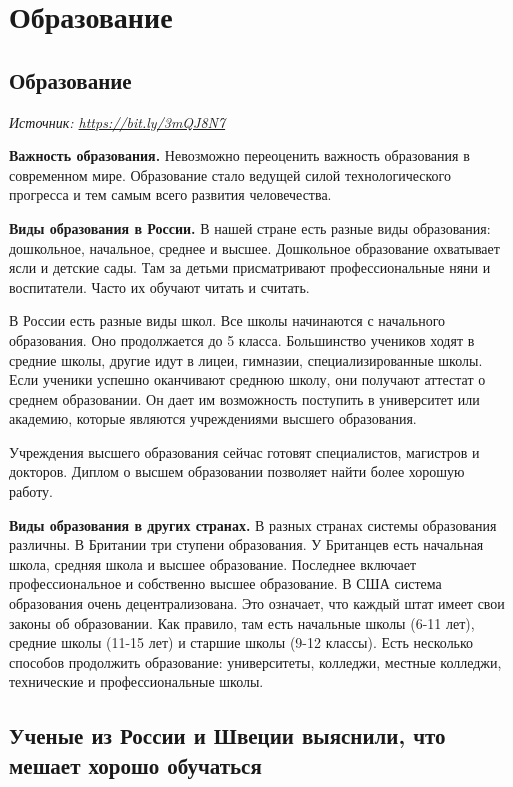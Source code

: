 \chapter{Образование}

\section{Образование}

\textit{Источник: \url{https://bit.ly/3mQJ8N7}}

\textbf{Важность образования.}
Невозможно переоценить важность образования в современном мире. Образование стало ведущей силой технологического прогресса и тем самым всего развития человечества.

\textbf{Виды образования в России.}
В нашей стране есть разные виды образования: дошкольное, начальное, среднее и высшее.
Дошкольное образование охватывает ясли и детские сады. Там за детьми присматривают профессиональные няни и воспитатели. Часто их обучают читать и считать.

В России есть разные виды школ. Все школы начинаются с начального образования. Оно продолжается до 5 класса. Большинство учеников ходят в средние школы, другие идут в лицеи, гимназии, специализированные школы. Если ученики успешно оканчивают среднюю школу, они получают аттестат о среднем образовании. Он дает им возможность поступить в университет или академию, которые являются учреждениями высшего образования.

Учреждения высшего образования сейчас готовят специалистов, магистров и докторов. Диплом о высшем образовании позволяет найти более хорошую работу.

\textbf{Виды образования в других странах.}
В разных странах системы образования различны. В Британии три ступени образования. У Британцев есть начальная школа, средняя школа и высшее образование. Последнее включает профессиональное и собственно высшее образование.
В США система образования очень децентрализована. Это означает, что каждый штат имеет свои законы об образовании. Как правило, там есть начальные школы (6-11 лет), средние школы (11-15 лет) и старшие школы (9-12 классы). Есть несколько способов продолжить образование: университеты, колледжи, местные колледжи, технические и профессиональные школы.

\clearpage
\section[Что мешает хорошо обучаться]{Ученые из России и Швеции выяснили, что мешает хорошо обучаться}

